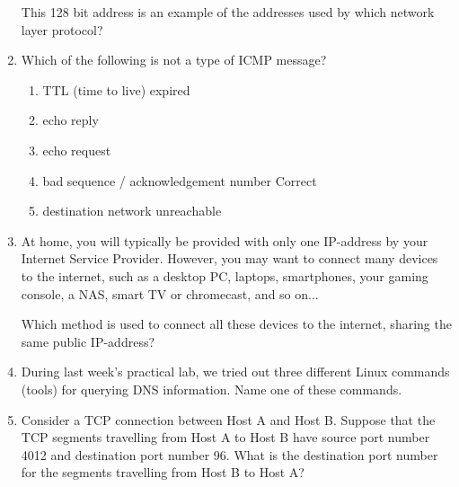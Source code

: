 \begin{enumerate}
    This 128 bit address is an example of the addresses used by which network layer protocol?
    \item Which of the following is not a type of ICMP message?
    \begin{enumerate}
        \item TTL (time to live) expired
        \item echo reply
        \item echo request
        \item bad sequence / acknowledgement number Correct
        \item destination network unreachable
    \end{enumerate}
    \item At home, you will typically be provided with only one IP-address by your Internet Service Provider. However, you may want to connect many devices to the internet, such as a desktop PC, laptops, smartphones, your gaming console, a NAS, smart TV or chromecast, and so on...

    Which method is used to connect all these devices to the internet, sharing the same public IP-address?
    \item During last week's practical lab, we tried out three different Linux commands (tools) for querying DNS information. Name one of these commands.

    \item Consider a TCP connection between Host A and Host B. Suppose that the TCP segments travelling from Host A to Host B have source port number 4012 and destination port number 96. What is the destination port number for the segments travelling from Host B to Host A?

\end{enumerate}
